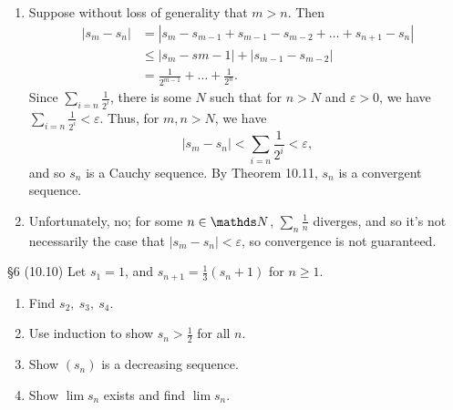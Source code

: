\documentclass{homework}
\begin{document}
\begin{solution}
  \begin{enumerate}[label=(\alph*)]
    \item Suppose without loss of generality that $m>n$. Then
      \begin{align*}
        \left| s_m-s_n \right| &=\left| s_m -s_{m-1}+s_{m-1}-s_{m-2}+\ldots+s_{n+1}-s_n\right| \\
                               &\le \left| s_m-s{m-1} \right| +\left| s_{m-1}-s_{m-2} \right| \\
                               &= \frac{1}{2^{m-1}}+\ldots+\frac{1}{2^{n}}
      .\end{align*} Since $\sum_{i=n} \frac{1}{2^{i}}$, there is some $N$ such that for $n>N$ and 
      $\varepsilon>0$, we have $\sum_{i=n} \frac{1}{2^{i}}<\varepsilon$. Thus, for $m,n>N$, we have
      \[
        \left| s_m-s_n \right| <\sum_{i=n} \frac{1}{2^{i}}<\varepsilon
      ,\] and so $s_n$ is a Cauchy sequence. By Theorem 10.11, $s_n$ is a convergent sequence.

    \item Unfortunately, no; for some $n\in \N$, $\sum_{n} \frac{1}{n}$ diverges, and so it's not
      necessarily the case that $\left| s_m-s_n \right| <\varepsilon$, so convergence is not
      guaranteed.
  \end{enumerate}
\end{solution}

\begin{problem}{\S 6}
  (10.10) Let $s_1=1$, and $s_{n+1}=\frac{1}{3}(s_n+1)$ for $n\ge 1$.
  \begin{enumerate}[label=(\alph*)]
    \item Find $ s_2,\ s_3,\ s_4$.
    \item Use induction to show $s_n>\frac{1}{2}$ for all $n$.
    \item Show $(s_n)$ is a decreasing sequence.
    \item Show $\lim{s_n}$ exists and find $\lim{s_n}$.
  \end{enumerate}
\end{problem}
\end{document}
